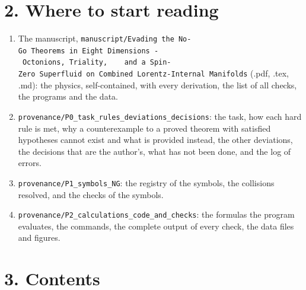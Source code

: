 \documentclass[
  10pt,
]{article}
\providecommand{\tightlist}{%
  \setlength{\itemsep}{0pt}\setlength{\parskip}{0pt}}
\begin{document}
\hypertarget{where-to-start-reading}{%
\section{2. Where to start reading}\label{where-to-start-reading}}

\begin{enumerate}
\def\labelenumi{\arabic{enumi}.}
\tightlist
\item
  The manuscript,
  \texttt{manuscript/Evading\ the\ No-Go\ Theorems\ in\ Eight\ Dimensions\ -\ Octonions,\ Triality,\ \ \ \ and\ a\ Spin-Zero\ Superfluid\ on\ Combined\ Lorentz-Internal\ Manifolds}
  (.pdf, .tex, .md): the physics, self-contained, with every derivation,
  the list of all checks, the programs and the data.
\item
  \texttt{provenance/P0\_task\_rules\_deviations\_decisions}: the task,
  how each hard rule is met, why a counterexample to a proved theorem
  with satisfied hypotheses cannot exist and what is provided instead,
  the other deviations, the decisions that are the author's, what has
  not been done, and the log of errors.
\item
  \texttt{provenance/P1\_symbols\_NG}: the registry of the symbols, the
  collisions resolved, and the checks of the symbols.
\item
  \texttt{provenance/P2\_calculations\_code\_and\_checks}: the formulas
  the program evaluates, the commands, the complete output of every
  check, the data files and figures.
\end{enumerate}

\hypertarget{contents}{%
\section{3. Contents}\label{contents}}
\end{document}

